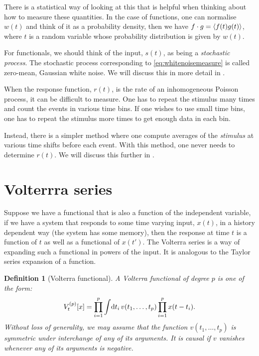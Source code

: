 \documentclass[12pt]{article}
\theoremstyle{slplain}
\theoremstyle{sldefinition}
\newtheorem{defn}{Definition}
\theoremstyle{remark}
\begin{document}
There is a statistical way of looking at this that is helpful when thinking about how to measure these quantities. In the case of functions, one can normalise $w(t)$ and think of it as a probability density, then we have $f \cdot g = \left\langle f(t)g(t) \right\rangle$, where $t$ is a random variable whose probability distribution is given by $w(t)$.

For functionals, we should think of the input, $s(t)$, as being a \emph{stochastic process}. The stochastic process corresponding to \eqref{eq:whitenoisemeasure} is called zero-mean, Gaussian white noise. We will discuss this in more detail in .

When the response function, $r(t)$, is the rate of an inhomogeneous Poisson process, it can be difficult to measure. One has to repeat the stimulus many times and count the events in various time bins. If one wishes to use small time bins, one has to repeat the stimulus more times to get enough data in each bin.

Instead, there is a simpler method where one compute averages of the \emph{stimulus} at various time shifts before each event. With this method, one never needs to determine $r(t)$. We will discuss this further in .


\section{Volterrra series}\label{sec:volterra}

Suppose we have a functional that is also a function of the independent variable, \eg if we have a system that responds to some time varying input, $x(t)$, in a history dependent way (\ie the system has some memory), then the response at time $t$ is a function of $t$ as well as a functional of $x(t')$.
The Volterra series is a way of expanding such a functional in powers of the input. It is analogous to the Taylor series expansion of a function.

\begin{defn}[Volterra functional]
  A Volterra functional of degree $p$ is one of the form:
  \begin{equation}\label{eq:volfunc}
    V^{(p)}_t[x] = \prod_{i=1}^p \int\!\mathrm{d} t_i\,  v(t_1,\ldots,t_p) \prod_{i=1}^p x(t-t_i).
  \end{equation}
  Without loss of generality, we may assume that the function $v(t_1,\ldots,t_p)$ is symmetric under interchange of any of its arguments. It is causal if $v$ vanishes whenever any of its arguments is negative.
\end{defn}
\end{document}
